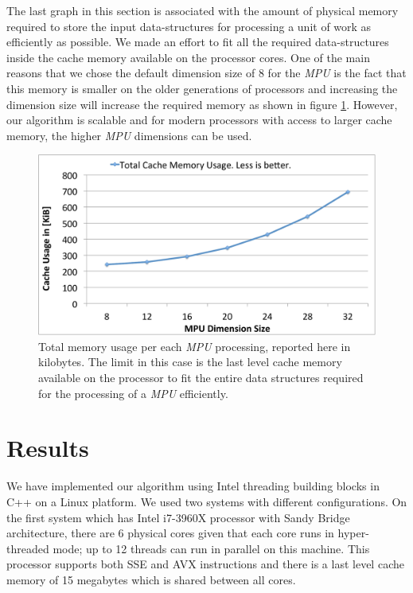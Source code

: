 The last graph in this section is associated with the amount of physical memory required to store the 
input data-structures for processing a unit of work as efficiently as possible. We made an effort to fit all the required 
data-structures inside the cache memory available on the processor cores. One of the main reasons that we
chose the default dimension size of 8 for the \textit{MPU} is the fact that this memory is smaller on the 
older generations of processors and increasing the dimension size will increase the required memory as shown in
figure \ref{fig:TotalCacheMemUsage}. However, our algorithm is scalable and for modern processors with 
access to larger cache memory, the higher \textit{MPU} dimensions can be used. 

\begin{figure}[H]
  \centering
  \includegraphics[width = 1.0\linewidth]{figures/cpupoly/MpuSizeAnalysis/TotalCacheMemUsage.pdf}
  \caption{\label{fig:TotalCacheMemUsage}
  {Total memory usage per each \textit{MPU} processing, reported here in kilobytes. 
  The limit in this case is the last level cache memory available on the processor to fit the 
  entire data structures required for the processing of a \textit{MPU} efficiently.}
}
\end{figure}


\section{Results}\label{sec:resultscpupoly}
We have implemented our algorithm using Intel threading building blocks in C++ on a Linux platform. We used two systems with 
different configurations. On the first system which has Intel i7-3960X processor with Sandy Bridge architecture, there are 6 
physical cores given that each core runs in hyper-threaded mode; up to 12 threads can run in parallel on this machine. 
This processor supports both SSE and AVX instructions and there is a last level cache memory of 15 megabytes 
which is shared between all cores.

